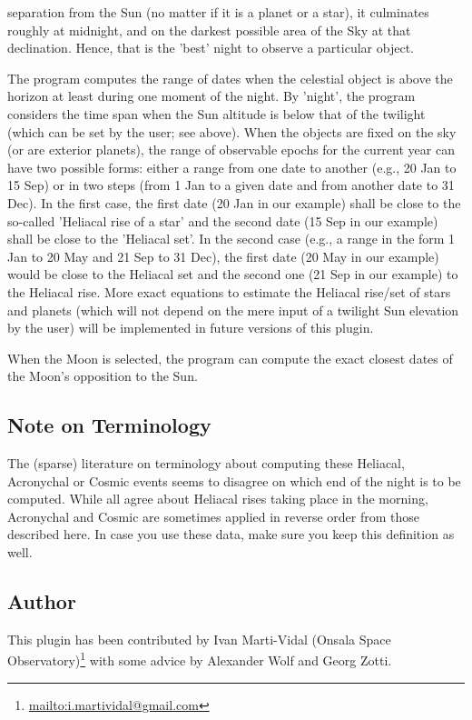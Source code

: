 \begin{description}
  separation from the Sun (no matter if it is a planet or a star), it
  culminates roughly at midnight, and on the darkest possible area of
  the Sky at that declination. Hence, that is the 'best' night to
  observe a particular object.
\item[Nights with source above horizon] The program computes the range
  of dates when the celestial object is above the horizon at least
  during one moment of the night. By 'night', the program considers
  the time span when the Sun altitude is below that of the twilight
  (which can be set by the user; see above). When the objects are
  fixed on the sky (or are exterior planets), the range of observable
  epochs for the current year can have two possible forms: either a
  range from one date to another (e.g., 20 Jan to 15 Sep) or in two
  steps (from 1 Jan to a given date and from another date to 31
  Dec). In the first case, the first date (20 Jan in our example)
  shall be close to the so-called 'Heliacal rise of a star' and the
  second date (15 Sep in our example) shall be close to the 'Heliacal
  set'. In the second case (e.g., a range in the form 1 Jan to 20 May
  and 21 Sep to 31 Dec), the first date (20 May in our example) would
  be close to the Heliacal set and the second one (21 Sep in our
  example) to the Heliacal rise. More exact equations to estimate the
  Heliacal rise/set of stars and planets (which will not depend on the
  mere input of a twilight Sun elevation by the user) will be
  implemented in future versions of this plugin.
\item[Full Moon] When the Moon is selected, the program can compute
  the exact closest dates of the Moon's opposition to the Sun.
\end{description}

\subsection*{Note on Terminology}

The (sparse) literature on terminology about computing these Heliacal, Acronychal or Cosmic events 
seems to disagree on which end of the night is to be computed. While all agree about 
Heliacal rises taking place in the morning, Acronychal and Cosmic are sometimes applied 
in reverse order from those described here. In case you use these data, make sure you 
keep this definition as well. 

\subsection*{Author}
\label{sec:plugins:Observability:author}
This plugin has been contributed by Ivan Marti-Vidal (Onsala Space Observatory)\footnote{\url{mailto:i.martividal@gmail.com}} with some advice by Alexander Wolf and Georg Zotti.

